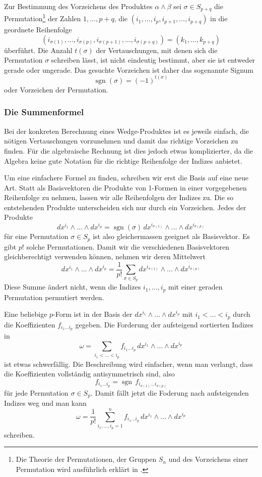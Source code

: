 Zur Bestimmung des Vorzeichens des Produktes $\alpha\wedge\beta$ 
sei $\sigma\in S_{p+q}$ die Permutation\footnote{Die Theorie der
Permutationen, der Gruppen $S_n$ und des Vorzeichens einer Permutation
wird ausführlich erklärt in \cite[Abschnitt~4.3.4]{buch:linalg}.}
der Zahlen $1,\dots,p+q$,
die $(i_1,\dots,i_p,i_{p+1},\dots,i_{p+q})$ in die geordnete
Reihenfolge
\[
(i_{\sigma(1)},\dots,i_{\sigma(p)},i_{\sigma(p+1)},\dots,i_{\sigma(p+q)})
=
(k_1,\dots,k_{p+q})
\]
überführt.
Die Anzahl $t(\sigma)$ der Vertauschungen, mit denen sich die
Permutation $\sigma$ schreiben lässt, ist nicht eindeutig bestimmt,
aber sie ist entweder gerade oder ungerade.
Das gesuchte Vorzeichen ist daher das sogenannte Signum
\[
\operatorname{sgn}(\sigma) = (-1)^{t(\sigma)}
\]
oder Vorzeichen der Permutation.

%
%
\subsubsection{Die Summenformel}
Bei der konkreten Berechnung eines Wedge-Produktes ist es jeweils
einfach, die nötigen Vertauschungen vorzunehmen und damit das
richtige Vorzeichen zu finden.
Für die algebraische Rechnung ist dies jedoch etwas komplizierter,
da die Algebra keine gute Notation für die richtige Reihenfolge der
Indizes anbietet.

Um eine einfachere Formel zu finden, schreiben wir erst die Basis
auf eine neue Art.
Statt als Basisvektoren die Produkte von 1-Formen in einer vorgegebenen
Reihenfolge zu nehmen, lassen wir alle Reihenfolgen der Indizes zu.
Die so entstehenden Produkte unterscheiden sich nur durch ein
Vorzeichen.
Jedes der Produkte
\[
dx^{i_1}\wedge\dots\wedge dx^{i_p}
=
\operatorname{sgn}(\sigma)
\,
dx^{i_{\sigma(1)}} \wedge\dots\wedge dx^{i_{\sigma(p)}}
\]
für eine Permutation $\sigma\in S_p$ ist also gleichermassen geeignet
als Basisvektor.
Es gibt $p!$ solche Permutationen.
Damit wir die verschiedenen Basisvektoren gleichberechtigt verwenden
können, nehmen wir deren Mittelwert
\[
dx^{i_1}\wedge\dots\wedge dx^{i_p}
=
\frac{1}{p!}
\sum_{\sigma\in S_p} dx^{i_{\sigma(1)}} \wedge\dots\wedge dx^{i_{\sigma(p)}}
\]
Diese Summe ändert nicht, wenn die Indizes $i_1,\dots,i_p$ mit einer
geraden Permutation permutiert werden.

Eine beliebige $p$-Form ist in der Basis der
$dx^{i_1}\wedge\dots\wedge dx^{i_p}$  mit $i_1<\dots<i_p$
durch die Koeffizienten $f_{i_1\dots i_p}$ gegeben.
Die Forderung der aufsteigend sortierten Indizes in
\[
\omega
=
\sum_{i_1<\dots<i_p}
f_{i_1\dots i_p}\,
dx^{i_1}\wedge\dots\wedge dx^{i_p}
\]
ist etwas schwerfällig.
Die Beschreibung wird einfacher, wenn man verlangt, dass die
Koeffizienten vollständig antisymmetrisch sind, also
\[
f_{i_1\dots i_p}
=
\operatorname{sgn}\,
f_{i_{\sigma(1)}\dots i_{\sigma(p)}}
\]
für jede Permutation $\sigma\in S_p$.
Damit fällt jetzt die Foderung nach aufsteigenden Indizes weg und man
kann
\begin{equation}
\omega
=
\frac{1}{p!}
\sum_{i_1,\dots,i_p=1}^n
f_{i_1\dots i_p}
\,
dx^{i_1}\wedge\dots\wedge dx^{i_p}
\label{buch:pformen:pformen:eqn:summenformel}
\end{equation}
schreiben.

